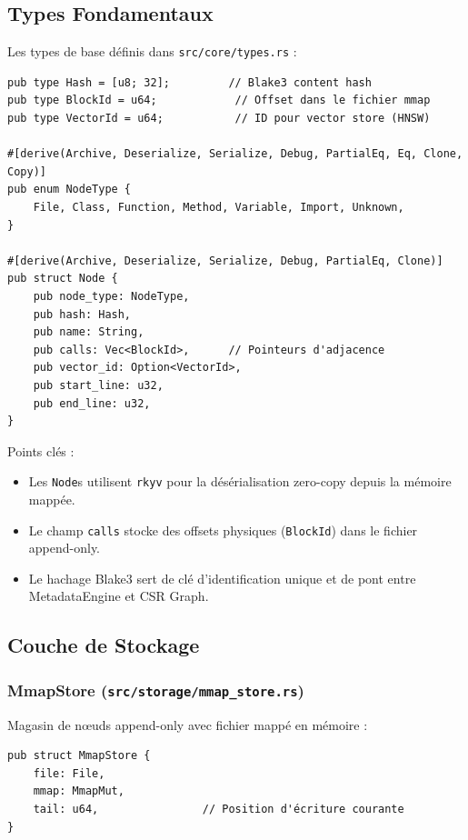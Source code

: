 \documentclass[12pt,a4paper]{article}
\newcommand{\code}[1]{\texttt{#1}}
\begin{document}
\subsection{Types Fondamentaux}

Les types de base définis dans \code{src/core/types.rs} :

\begin{verbatim}
pub type Hash = [u8; 32];         // Blake3 content hash
pub type BlockId = u64;            // Offset dans le fichier mmap
pub type VectorId = u64;           // ID pour vector store (HNSW)

#[derive(Archive, Deserialize, Serialize, Debug, PartialEq, Eq, Clone, Copy)]
pub enum NodeType {
    File, Class, Function, Method, Variable, Import, Unknown,
}

#[derive(Archive, Deserialize, Serialize, Debug, PartialEq, Clone)]
pub struct Node {
    pub node_type: NodeType,
    pub hash: Hash,
    pub name: String,
    pub calls: Vec<BlockId>,      // Pointeurs d'adjacence
    pub vector_id: Option<VectorId>,
    pub start_line: u32,
    pub end_line: u32,
}
\end{verbatim}

Points clés :
\begin{itemize}
    \item Les \code{Node}s utilisent \code{rkyv} pour la désérialisation zero-copy depuis la mémoire mappée.
    \item Le champ \code{calls} stocke des offsets physiques (\code{BlockId}) dans le fichier append-only.
    \item Le hachage Blake3 sert de clé d'identification unique et de pont entre MetadataEngine et CSR Graph.
\end{itemize}

\subsection{Couche de Stockage}

\subsubsection{MmapStore (\code{src/storage/mmap\_store.rs})}

Magasin de nœuds append-only avec fichier mappé en mémoire :

\begin{verbatim}
pub struct MmapStore {
    file: File,
    mmap: MmapMut,
    tail: u64,                // Position d'écriture courante
}
\end{verbatim}
\end{document}

